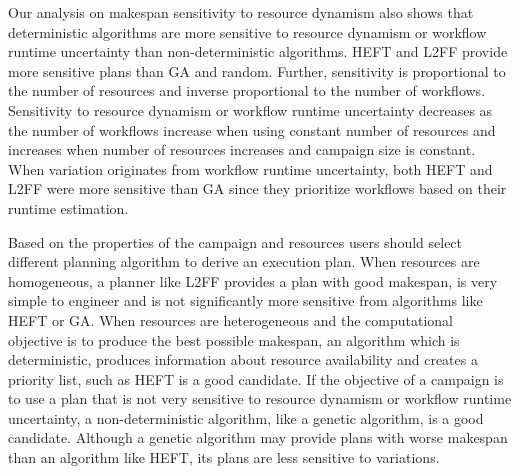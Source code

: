 Our analysis on makespan sensitivity to resource dynamism also shows that 
deterministic algorithms are more sensitive to resource dynamism or workflow 
runtime uncertainty than non-deterministic algorithms. HEFT and L2FF provide 
more sensitive plans than GA and random. Further, sensitivity is proportional 
to the number of resources and inverse proportional to the number of workflows.
Sensitivity to resource dynamism or workflow runtime uncertainty decreases as 
the number of workflows increase when using constant number of resources and 
increases when number of resources increases and campaign size is constant.
When variation originates from workflow runtime uncertainty, both HEFT and 
L2FF were more sensitive than GA since they prioritize workflows based on 
their runtime estimation.

Based on the properties of the campaign and resources users should select 
different planning algorithm to derive an execution plan. When resources are 
homogeneous, a planner like L2FF provides a plan with good makespan, is very 
simple to engineer and is not significantly more sensitive from algorithms 
like HEFT or GA. When resources are heterogeneous and the computational 
objective is to produce the best possible makespan, an algorithm which is 
deterministic, produces information about resource availability and creates a 
priority list, such as HEFT is a good candidate. If the objective of a 
campaign is to use a plan that is not very sensitive to resource dynamism or 
workflow runtime uncertainty, a non-deterministic algorithm, like a genetic 
algorithm, is a good candidate. Although a genetic algorithm may provide plans 
with worse makespan than an algorithm like HEFT, its plans are less sensitive 
to variations.



